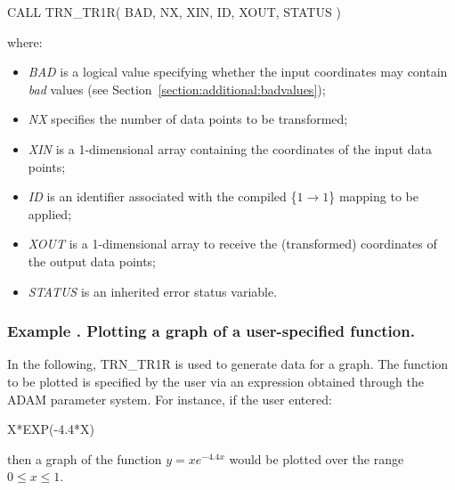 \documentclass[twoside,nolof,11pt]{starlink}
\providecommand{\name}[1]{\small{#1}}
\providecommand{\fortvar}[1]{\emph{#1}}
\newcounter{examplecounter}
\providecommand{\example}[1]{\addtocounter{examplecounter}{1}
                         \subsubsection*{Example \theexamplecounter. #1}}
\begin{document}
\begin{terminalv}
CALL TRN_TR1R( BAD, NX, XIN, ID, XOUT, STATUS )
\end{terminalv}

where:

\begin{itemize}

\item \fortvar{BAD} is a logical value specifying whether the input
coordinates may contain \emph{bad} values (see
Section~\ref{section:additional:badvalues});

\item \fortvar{NX} specifies the number of data points to be transformed;

\item \fortvar{XIN} is a 1-dimensional array containing the coordinates of
the input data points;

\item \fortvar{ID} is an identifier associated with the compiled \mbox{\{$1
\rightarrow 1$\}} mapping to be applied;

\item \fortvar{XOUT} is a 1-dimensional array to receive the (transformed)
coordinates of the output data points;

\item \fortvar{STATUS} is an inherited error status variable.

\end{itemize}

\example{Plotting a graph of a user-specified function.}
In the following, \name{TRN\_TR1R} is used to generate data for a graph.
The function to be plotted is specified by the user via an expression
obtained through the \name{ADAM} parameter system.
For instance, if the user entered:

\begin{terminalv}
X*EXP(-4.4*X)
\end{terminalv}

then a graph of the function \mbox{$y=xe^{-4.4x}$} would be plotted over the
range \mbox{$0\le x\le 1$}.
\end{document}

